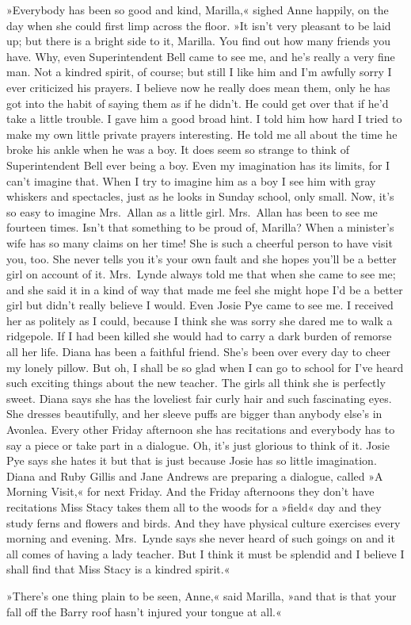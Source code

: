 »Everybody has been so good and kind, Marilla,« sighed Anne happily, on the day when she could first limp across the floor. »It isn't very pleasant to be laid up; but there is a bright side to it, Marilla. You find out how many friends you have. Why, even Superintendent Bell came to see me, and he's really a very fine man. Not a kindred spirit, of course; but still I like him and I'm awfully sorry I ever criticized his prayers. I believe now he really does mean them, only he has got into the habit of saying them as if he didn't. He could get over that if he'd take a little trouble. I gave him a good broad hint. I told him how hard I tried to make my own little private prayers interesting. He told me all about the time he broke his ankle when he was a boy. It does seem so strange to think of Superintendent Bell ever being a boy. Even my imagination has its limits, for I can't imagine that. When I try to imagine him as a boy I see him with gray whiskers and spectacles, just as he looks in Sunday school, only small. Now, it's so easy to imagine Mrs.~Allan as a little girl. Mrs.~Allan has been to see me fourteen times. Isn't that something to be proud of, Marilla? When a minister's wife has so many claims on her time! She is such a cheerful person to have visit you, too. She never tells you it's your own fault and she hopes you'll be a better girl on account of it. Mrs.~Lynde always told me that when she came to see me; and she said it in a kind of way that made me feel she might hope I'd be a better girl but didn't really believe I would. Even Josie Pye came to see me. I received her as politely as I could, because I think she was sorry she dared me to walk a ridgepole. If I had been killed she would had to carry a dark burden of remorse all her life. Diana has been a faithful friend. She's been over every day to cheer my lonely pillow. But oh, I shall be so glad when I can go to school for I've heard such exciting things about the new teacher. The girls all think she is perfectly sweet. Diana says she has the loveliest fair curly hair and such fascinating eyes. She dresses beautifully, and her sleeve puffs are bigger than anybody else's in Avonlea. Every other Friday afternoon she has recitations and everybody has to say a piece or take part in a dialogue. Oh, it's just glorious to think of it. Josie Pye says she hates it but that is just because Josie has so little imagination. Diana and Ruby Gillis and Jane Andrews are preparing a dialogue, called »A Morning Visit,« for next Friday. And the Friday afternoons they don't have recitations Miss Stacy takes them all to the woods for a »field« day and they study ferns and flowers and birds. And they have physical culture exercises every morning and evening. Mrs.~Lynde says she never heard of such goings on and it all comes of having a lady teacher. But I think it must be splendid and I believe I shall find that Miss Stacy is a kindred spirit.«

»There's one thing plain to be seen, Anne,« said Marilla, »and that is that your fall off the Barry roof hasn't injured your tongue at all.«